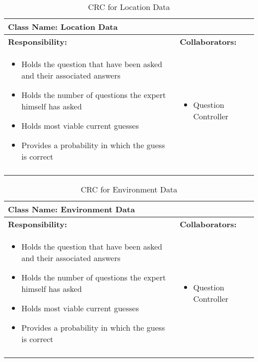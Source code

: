 \documentclass[titlepage]{article}
\begin{document}
	\begin{longtable}{| p{} | p{} |}
			\hline
			 \multicolumn{2}{|l|}{\textbf{Class Name: Location Data}} \\
			\hline
			\textbf{Responsibility:} & \textbf{Collaborators:} \\
			\hline
				\begin{itemize}
					\item Holds the question that have been asked and their associated answers
					\item Holds the number of questions the expert himself has asked
					\item Holds most viable current guesses
					\item Provides a probability in which the guess is correct
				\end{itemize} & 
				\begin{itemize}
					\item Question Controller
				\end{itemize} 
				\\
			\hline
		\caption{CRC for Location Data}
	\end{longtable}
	
	\begin{longtable}{| p{} | p{} |}
			\hline
			 \multicolumn{2}{|l|}{\textbf{Class Name: Environment Data}} \\
			\hline
			\textbf{Responsibility:} & \textbf{Collaborators:} \\
			\hline
				\begin{itemize}
					\item Holds the question that have been asked and their associated answers
					\item Holds the number of questions the expert himself has asked
					\item Holds most viable current guesses
					\item Provides a probability in which the guess is correct
				\end{itemize} & 
				\begin{itemize}
					\item Question Controller
				\end{itemize} 
				\\
			\hline
		\caption{CRC for Environment Data}
	\end{longtable}
	
\end{document}
